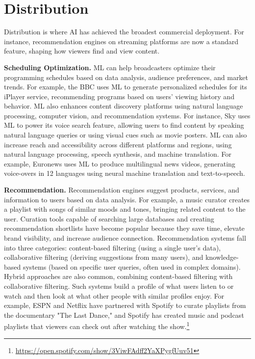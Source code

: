 \documentclass[sigconf,authorversion,review,authordraft]{webmedia}
\begin{document}
\section{Distribution}
\label{sec:distribution}

Distribution is where AI has achieved the broadest commercial deployment. For instance, recommendation engines on streaming platforms are now a standard feature, shaping how viewers find and view content.

\textbf{Scheduling Optimization.} ML can help broadcasters optimize their programming schedules based on data analysis, audience preferences, and market trends. For example, the BBC uses ML to generate personalized schedules for its iPlayer service, recommending programs based on users' viewing history and behavior. ML also enhances content discovery platforms using natural language processing, computer vision, and recommendation systems. For instance, Sky uses ML to power its voice search feature, allowing users to find content by speaking natural language queries or using visual cues such as movie posters. ML can also increase reach and accessibility across different platforms and regions, using natural language processing, speech synthesis, and machine translation. For example, Euronews uses ML to produce multilingual news videos, generating voice-overs in 12 languages using neural machine translation and text-to-speech.

\textbf{Recommendation.} Recommendation engines suggest products, services, and information to users based on data analysis. For example, a music curator creates a playlist with songs of similar moods and tones, bringing related content to the user. Curation tools capable of searching large databases and creating recommendation shortlists have become popular because they save time, elevate brand visibility, and increase audience connection. Recommendation systems fall into three categories: content-based filtering (using a single user's data), collaborative filtering (deriving suggestions from many users), and knowledge-based systems (based on specific user queries, often used in complex domains). Hybrid approaches are also common, combining content-based filtering with collaborative filtering. Such systems build a profile of what users listen to or watch and then look at what other people with similar profiles enjoy. For example, ESPN and Netflix have partnered with Spotify to curate playlists from the documentary "The Last Dance," and Spotify has created music and podcast playlists that viewers can check out after watching the show.\footnote{\url{https://open.spotify.com/show/3ViwFAdff2YaXPygfUuv51}}
\end{document}
